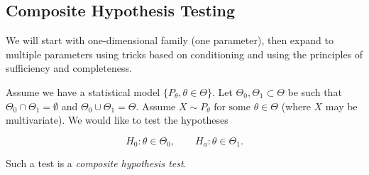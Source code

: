 \subsection{Composite Hypothesis Testing}




We will start with one-dimensional family (one parameter), then expand to multiple parameters using tricks based on conditioning and using the principles of sufficiency and completeness.

\begin{definition}



Assume we have a statistical model \(\{P_\theta, \theta \in \Theta\}\). Let \(\Theta_0, \Theta_1 \subset \Theta\) be such that \(\Theta_0 \cap \Theta_1 = \emptyset\) and \(\Theta_0 \cup \Theta_1 = \Theta\). Assume \( X \sim P_\theta \text{ for some } \theta \in \Theta\) (where \(X\) may be multivariate). We would like to test the hypotheses

\[
H_0:  \theta \in \Theta_0, \qquad H_a: \theta \in \Theta_1.
\]

Such a test is a \textit{composite hypothesis test}.

\end{definition}

